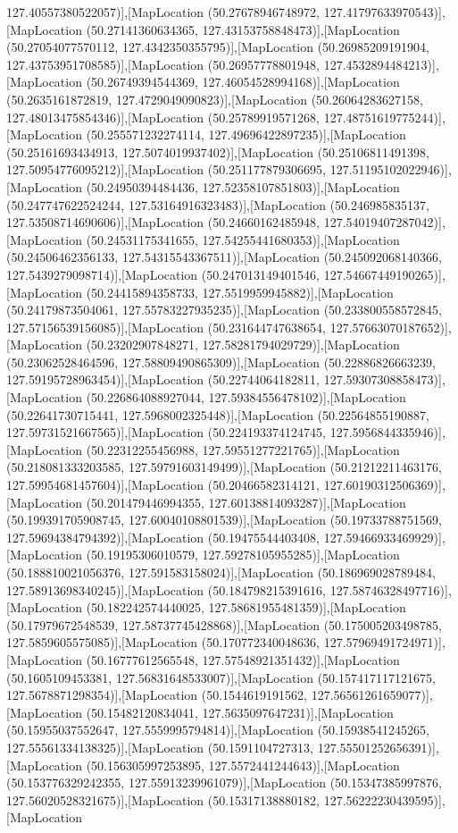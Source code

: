 127.40557380522057)],[MapLocation (50.27678946748972, 127.41797633970543)],[MapLocation (50.27141360634365, 127.43153758848473)],[MapLocation (50.27054077570112, 127.4342350355795)],[MapLocation (50.26985209191904, 127.43753951708585)],[MapLocation (50.26957778801948, 127.4532894484213)],[MapLocation (50.26749394544369, 127.46054528994168)],[MapLocation (50.2635161872819, 127.4729049090823)],[MapLocation (50.26064283627158, 127.48013475854346)],[MapLocation (50.25789919571268, 127.48751619775244)],[MapLocation (50.255571232274114, 127.49696422897235)],[MapLocation (50.25161693434913, 127.5074019937402)],[MapLocation (50.25106811491398, 127.50954776095212)],[MapLocation (50.251177879306695, 127.51195102022946)],[MapLocation (50.24950394484436, 127.52358107851803)],[MapLocation (50.247747622524244, 127.53164916323483)],[MapLocation (50.246985835137, 127.53508714690606)],[MapLocation (50.24660162485948, 127.54019407287042)],[MapLocation (50.24531175341655, 127.54255441680353)],[MapLocation (50.24506462356133, 127.54315543367511)],[MapLocation (50.245092068140366, 127.5439279098714)],[MapLocation (50.247013149401546, 127.54667449190265)],[MapLocation (50.24415894358733, 127.5519959945882)],[MapLocation (50.24179873504061, 127.55783227935235)],[MapLocation (50.233800558572845, 127.57156539156085)],[MapLocation (50.231644747638654, 127.57663070187652)],[MapLocation (50.23202907848271, 127.58281794029729)],[MapLocation (50.23062528464596, 127.58809490865309)],[MapLocation (50.22886826663239, 127.59195728963454)],[MapLocation (50.22744064182811, 127.59307308858473)],[MapLocation (50.226864088927044, 127.59384556478102)],[MapLocation (50.22641730715441, 127.5968002325448)],[MapLocation (50.22564855190887, 127.59731521667565)],[MapLocation (50.224193374124745, 127.5956844335946)],[MapLocation (50.22312255456988, 127.59551277221765)],[MapLocation (50.218081333203585, 127.59791603149499)],[MapLocation (50.21212211463176, 127.59954681457604)],[MapLocation (50.20466582314121, 127.60190312506369)],[MapLocation (50.201479446994355, 127.60138814093287)],[MapLocation (50.199391705908745, 127.60040108801539)],[MapLocation (50.19733788751569, 127.59694384794392)],[MapLocation (50.19475544403408, 127.59466933469929)],[MapLocation (50.19195306010579, 127.59278105955285)],[MapLocation (50.188810021056376, 127.591583158024)],[MapLocation (50.186969028789484, 127.58913698340245)],[MapLocation (50.184798215391616, 127.58746328497716)],[MapLocation (50.182242574440025, 127.58681955481359)],[MapLocation (50.17979672548539, 127.58737745428868)],[MapLocation (50.175005203498785, 127.5859605575085)],[MapLocation (50.170772340048636, 127.57969491724971)],[MapLocation (50.16777612565548, 127.57548921351432)],[MapLocation (50.1605109453381, 127.56831648533007)],[MapLocation (50.157417117121675, 127.5678871298354)],[MapLocation (50.1544619191562, 127.56561261659077)],[MapLocation (50.15482120834041, 127.5635097647231)],[MapLocation (50.15955037552647, 127.5559995794814)],[MapLocation (50.15938541245265, 127.55561334138325)],[MapLocation (50.1591104727313, 127.55501252656391)],[MapLocation (50.156305997253895, 127.5572441244643)],[MapLocation (50.153776329242355, 127.55913239961079)],[MapLocation (50.15347385997876, 127.56020528321675)],[MapLocation (50.15317138880182, 127.56222230439595)],[MapLocation 